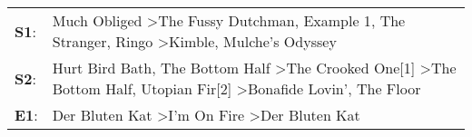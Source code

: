 \begin{supertabular}{p{0.03\textwidth}p{0.92\textwidth}}
 \textbf{S1}:  &                                    Much Obliged\textsuperscript{} \textgreater \enspace The Fussy Dutchman\textsuperscript{}, \enspace Example 1\textsuperscript{}, \enspace The Stranger\textsuperscript{}, \enspace Ringo\textsuperscript{} \textgreater \enspace Kimble\textsuperscript{}, \enspace Mulche's Odyssey\textsuperscript{}  \enspace  \\
 \textbf{S2}:  &  Hurt Bird Bath\textsuperscript{}, \enspace The Bottom Half\textsuperscript{} \textgreater \enspace The Crooked One[1]\textsuperscript{} \textgreater \enspace The Bottom Half\textsuperscript{}, \enspace Utopian Fir[2]\textsuperscript{} \textgreater \enspace Bonafide Lovin'\textsuperscript{}, \enspace The Floor\textsuperscript{}  \enspace  \\
 \textbf{E1}:  &                                                                                                                                                                                               Der Bluten Kat\textsuperscript{} \textgreater \enspace I'm On Fire\textsuperscript{} \textgreater \enspace Der Bluten Kat\textsuperscript{}  \enspace  \\
\end{supertabular}
